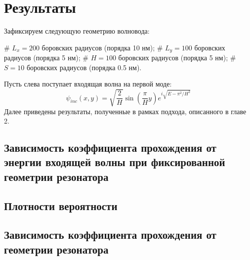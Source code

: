 \chapter{Результаты} 
\label{chapter3}



Зафиксируем следующую геометрию волновода:
\begin{ilist}
# $L_x = 200$ боровских радиусов (порядка 10 нм);
# $L_y = 100$ боровских радиусов (порядка 5 нм);
# $H = 100$ боровских радиусов (порядка 5 нм);
# $S = 10$ боровских радиусов (порядка 0.5 нм).
\end{ilist}
Пусть слева поступает входящая волна на первой моде:
\[
\psi_{inc}(x, y) = \sqrt{\frac{2}{H}} \sin(\frac{\pi}{H} y) e^{i \sqrt{E - \pi^2 / H^2}}
\]
Далее приведены результаты, полученные в рамках подхода, описанного в главе 2.
\section{Зависимость коэффициента прохождения от энергии входящей волны при фиксированной геометрии резонатора}

\section{Плотности вероятности}

\section{Зависимость коэффициента прохождения от геометрии резонатора}